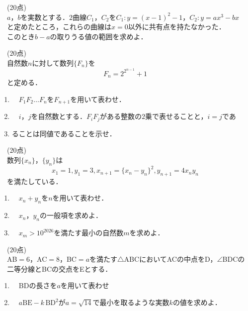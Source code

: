 \documentclass[a4paper]{ltjsarticle}
\begin{document}



\fontsize{14truept}{14truept}\selectfont

\white\white{}\noindent
{}　\;(20点)
\\[5mm]\indent
　$a$，$b$を実数とする．$2$曲線$C_1$，$C_2$を$C_1:y=(x-1)^2-1$，$C_2:y=ax^3-bx$\\[2mm]
　と定めたところ，これらの曲線は$x=0$以外に共有点を持たなかった．\\[2mm]
　このとき$b-a$の取りうる値の範囲を求めよ．


\newpage\noindent{}　($20$点)\\[5mm]\indent
　自然数$n$に対して数列$\{F_n\}$を
\[F_n=2^{2^{n-1}}+1\]
　と定める．\\[5mm]
\begin{enumerate}
\item[(1)]　$F_1F_2\dots F_n$を$F_{n+1}$を用いて表わせ．
\item[(2)]　$i$，$j$を自然数とする．$F_iF_j$がある整数の$2$乗で表せることと，$i=j$であ
\item[]ることは同値であることを示せ．
\end{enumerate}


\newpage\noindent{}　($20$点)\\[5mm]\indent
　数列$\{x_n\}$，$\{y_n\}$は
\[x_1=1,　y_1=3,　x_{n+1}=\{x_n-y_n\}^2,　y_{n+1}=4x_ny_n\]
　を満たしている．\\[5mm]
\begin{enumerate}
\item[(1)]　$x_n+y_n$を$n$を用いて表わせ．
\item[(2)]　$x_n$，$y_n$の一般項を求めよ．
\item[(3)]　$x_m>10^{2026}$を満たす最小の自然数$m$を求めよ．
\end{enumerate}

\newpage\noindent{}　($20$点)\\[5mm]\indent
　AB$=6$，AC$=8$，BC$=a$を満たす$\triangle$ABCにおいてACの中点をD，$\angle$BDCの\\[3mm]
　二等分線とBCの交点をEとする．\\[5mm]

\begin{enumerate}
\item[(1)]　BDの長さを$a$を用いて表わせ
\item[(2)]　$a\mathrm{BE}-k\mathrm{\,BD}^2$が$a=\sqrt{14}$で最小を取るような実数$k$の値を求めよ．
\end{enumerate}

\vfill{}\leavevmode\\[6mm]
\white\white
\end{document}
